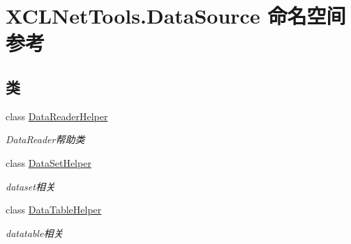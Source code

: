 \hypertarget{namespace_x_c_l_net_tools_1_1_data_source}{}\section{X\+C\+L\+Net\+Tools.\+Data\+Source 命名空间参考}
\label{namespace_x_c_l_net_tools_1_1_data_source}
\subsection*{类}
\begin{DoxyCompactItemize}
\item 
class \hyperlink{class_x_c_l_net_tools_1_1_data_source_1_1_data_reader_helper}{Data\+Reader\+Helper}
\begin{DoxyCompactList}\small\item\em Data\+Reader帮助类 \end{DoxyCompactList}\item 
class \hyperlink{class_x_c_l_net_tools_1_1_data_source_1_1_data_set_helper}{Data\+Set\+Helper}
\begin{DoxyCompactList}\small\item\em dataset相关 \end{DoxyCompactList}\item 
class \hyperlink{class_x_c_l_net_tools_1_1_data_source_1_1_data_table_helper}{Data\+Table\+Helper}
\begin{DoxyCompactList}\small\item\em datatable相关 \end{DoxyCompactList}\end{DoxyCompactItemize}
